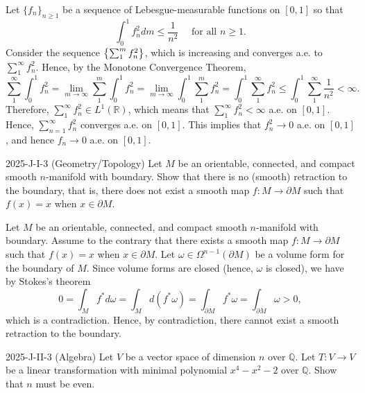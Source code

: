 \documentclass{article}
\begin{document}
\begin{solutions}
	Let $\{f_{n}\}_{n\geq 1}$ be a sequence of Lebesgue-measurable functions on $[0,1]$ so that 
		\begin{equation}
			\int_{0}^{1}f_{n}^{2}dm \leq \frac{1}{n^{2}} \quad \text{ for all } n \geq 1. 
		\end{equation}
	Consider the sequence $\brac*{\sum_{1}^{m}f_{n}^{2}}$, which is increasing and converges a.e. to $\sum_{1}^{\infty}f_{n}^{2}$. Hence, by the Monotone Convergence Theorem, 
		\begin{equation}
			\sum_{1}^{\infty}\int_{0}^{1} f_{n}^{2} = \lim_{m \to \infty}\sum_{1}^{m}\int_{0}^{1} f_{n}^{2} = \lim_{m \to \infty}\int_{0}^{1} \sum_{1}^{m}f_{n}^{2} = \int_{0}^{1}\sum_{1}^{\infty}f_{n}^{2} \leq \int_{0}^{1}\sum_{1}^{\infty}\frac{1}{n^{2}} < \infty. 
		\end{equation}
	Therefore, $\sum_{1}^{\infty}f_{n}^{2} \in L^{1}(\mathbb{R})$, which means that $\sum_{1}^{\infty}f_{n}^{2} < \infty$ a.e. on $[0,1]$. Hence, $\sum_{n = 1}^{\infty}f_{n}^{2}$ converges a.e. on $[0,1]$. This implies that $f_{n}^{2} \to 0$ a.e. on $[0,1]$, and hence $f_{n} \to 0$ a.e. on $[0,1]$. 
\end{solutions}
\begin{prb}{2025-J-I-3 (Geometry/Topology)}
	Let $M$ be an orientable, connected, and compact smooth $n$-manifold with boundary. Show that there is no (smooth) retraction to the boundary, that is, there does not exist a smooth map $f: M \to \partial M$ such that $f(x) = x$ when $x \in \partial M$. 
\end{prb}
\begin{solutions}
	Let $M$ be an orientable, connected, and compact smooth $n$-manifold with boundary. Assume to the contrary that there exists a smooth map $f: M \to \partial M$ such that $f(x) = x$ when $x \in \partial M$. Let $\omega \in \Omega^{n- 1}(\partial M)$ be a volume form for the boundary of $M$. Since volume forms are closed (hence, $\omega$ is closed), we have by Stokes's theorem 
		\begin{equation}
			0 = \int_{M}f^{\ast}d\omega = \int_{M}d(f^{\ast}\omega) = \int_{\partial M}f^{\ast}\omega = \int_{\partial M}\omega > 0, 
		\end{equation}
	which is a contradiction. Hence, by contradiction, there cannot exist a smooth retraction to the boundary. 
\end{solutions}
\begin{prb}{2025-J-II-3 (Algebra)}
	Let $V$ be a vector space of dimension $n$ over $\mathbb{Q}$. Let $T: V \to V$ be a linear transformation with minimal polynomial $x^{4} - x^{2} - 2$ over $\mathbb{Q}$. Show that $n$ must be even. 
\end{prb}
\end{document}
